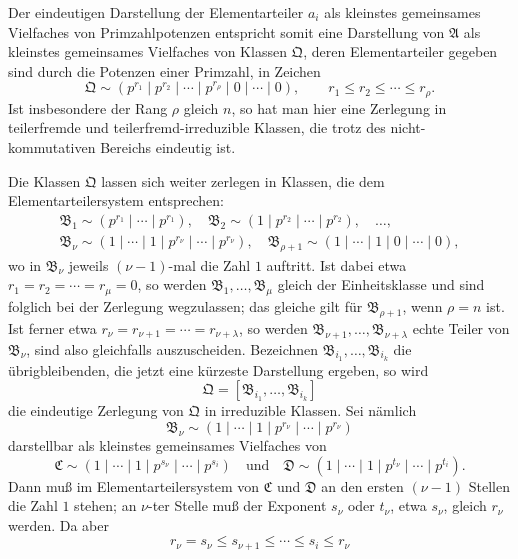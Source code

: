 \documentclass[11pt]{article}
\begin{document}
Der eindeutigen Darstellung der Elementarteiler $a_i$ als kleinstes gemeinsames Vielfaches von Primzahlpotenzen entspricht somit eine Darstellung von $\mathfrak A$ als kleinstes gemeinsames Vielfaches von Klassen $\mathfrak Q$, deren Elementarteiler gegeben sind durch die Potenzen einer Primzahl, in Zeichen
\[
 \mathfrak Q\sim(p^{r_1}\mid p^{r_2}\mid\cdots\mid p^{r_\rho}\mid0\mid\cdots\mid0),
 \qquad r_1\le r_2\le\cdots\le r_\rho.
\]
Ist insbesondere der Rang $\rho$ gleich $n$, so hat man hier eine Zerlegung in teilerfremde und teilerfremd-irreduzible Klassen, die trotz des nicht-kommutativen Bereichs eindeutig ist.

Die Klassen $\mathfrak Q$ lassen sich weiter zerlegen in Klassen, die dem Elementarteilersystem entsprechen:
\[
\begin{gathered}
 \mathfrak B_1\sim(p^{r_1}\mid\cdots\mid p^{r_1}),\quad
 \mathfrak B_2\sim(1\mid p^{r_2}\mid\cdots\mid p^{r_2}),\quad \ldots,\\
 \mathfrak B_\nu\sim(1\mid\cdots\mid1\mid p^{r_\nu}\mid\cdots\mid p^{r_\nu}),\quad
 \mathfrak B_{\rho+1}\sim(1\mid\cdots\mid1\mid0\mid\cdots\mid0),
\end{gathered}
\]
wo in $\mathfrak B_\nu$ jeweils $(\nu-1)$-mal die Zahl $1$ auftritt. Ist dabei etwa $r_1=r_2=\cdots=r_\mu=0$, so werden $\mathfrak B_1,
\ldots,\mathfrak B_\mu$ gleich der Einheitsklasse und sind folglich bei der Zerlegung wegzulassen; das gleiche gilt für $\mathfrak B_{\rho+1}$, wenn $\rho=n$ ist. Ist ferner etwa $r_\nu=r_{\nu+1}=\cdots=r_{\nu+\lambda}$, so werden $\mathfrak B_{\nu+1},
\ldots,\mathfrak B_{\nu+\lambda}$ echte Teiler von $\mathfrak B_\nu$, sind also gleichfalls auszuscheiden. Bezeichnen $\mathfrak B_{i_1},
\ldots,\mathfrak B_{i_k}$ die übrigbleibenden, die jetzt eine kürzeste Darstellung ergeben, so wird
\[
 \mathfrak Q=[\mathfrak B_{i_1},
\ldots,\mathfrak B_{i_k}]
\]
die eindeutige Zerlegung von $\mathfrak Q$ in irreduzible Klassen. Sei nämlich
\[
 \mathfrak B_\nu\sim(1\mid\cdots\mid1\mid p^{r_\nu}\mid\cdots\mid p^{r_\nu})
\]
darstellbar als kleinstes gemeinsames Vielfaches von
\[
 \mathfrak C\sim(1\mid\cdots\mid1\mid p^{s_\nu}\mid\cdots\mid p^{s_i})
 \quad\text{und}\quad
 \mathfrak D\sim(1\mid\cdots\mid1\mid p^{t_\nu}\mid\cdots\mid p^{t_i}).
\]
Dann muß im Elementarteilersystem von $\mathfrak C$ und $\mathfrak D$ an den ersten $(\nu-1)$ Stellen die Zahl $1$ stehen; an $\nu$-ter Stelle muß der Exponent $s_\nu$ oder $t_\nu$, etwa $s_\nu$, gleich $r_\nu$ werden. Da aber
\[
 r_\nu=s_\nu\le s_{\nu+1}\le\cdots\le s_i\le r_\nu
\]
\end{document}
